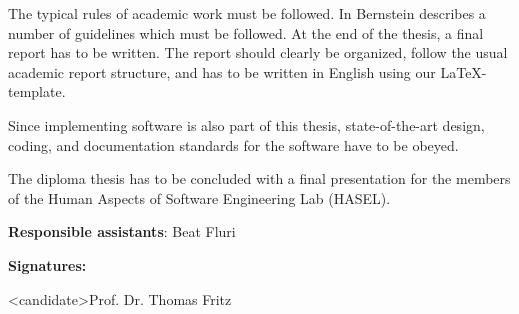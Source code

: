 \documentclass{task_description}
\begin{document}
The typical rules of academic work must be followed. In
\cite{Bernstein2005-daguide} Bernstein describes a number of guidelines which
must be followed. At the end of the thesis, a final report has to be
written. The report should clearly be organized, follow the usual academic
report structure, and has to be written in English using our \LaTeX-template.

Since implementing software is also part of this thesis, state-of-the-art
design, coding, and documentation standards for the software have to be obeyed.

The diploma thesis has to be concluded with a final presentation for the members
of the Human Aspects of Software Engineering Lab (HASEL).

\vspace{2em}
\noindent\textbf{Responsible assistants}: Beat Fluri

\vspace{2em}
\noindent\textbf{Signatures:}

\vspace{3\baselineskip}
\noindent <candidate>\hfill Prof. Dr. Thomas Fritz
\clearpage


\end{document}
